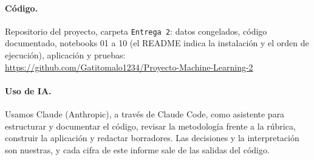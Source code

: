 \documentclass[11pt,letterpaper]{article}
\begin{document}
\paragraph{Código.} Repositorio del proyecto, carpeta \texttt{Entrega 2}: datos congelados, código documentado, notebooks 01 a 10 (el README indica la instalación y el orden de ejecución), aplicación y pruebas:\\
\url{https://github.com/Gatitomalo1234/Proyecto-Machine-Learning-2}

\paragraph{Uso de IA.} Usamos Claude (Anthropic), a través de Claude Code, como asistente para estructurar y documentar el código, revisar la metodología frente a la rúbrica, construir la aplicación y redactar borradores. Las decisiones y la interpretación son nuestras, y cada cifra de este informe sale de las salidas del código.
\end{document}
